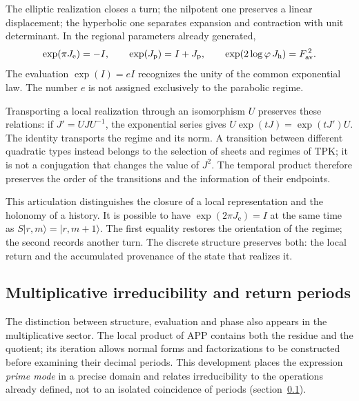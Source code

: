 The elliptic realization closes a turn; the nilpotent one preserves a
linear displacement; the hyperbolic one separates expansion and contraction with
unit determinant. In the regional parameters already generated,
\[
 \exp(\pi J_{\mathrm e})=-I,\qquad
 \exp(J_{\mathrm p})=I+J_{\mathrm p},\qquad
 \exp(2\log\varphi\,J_{\mathrm h})=F_{\rm av}^{\,2}.
\]
The evaluation \(\exp(I)=eI\) recognizes the unity of the common exponential
law. The number \(e\) is not assigned exclusively to the parabolic regime.

Transporting a local realization through an isomorphism \(U\) preserves
these relations: if \(J'=UJU^{-1}\), the exponential series gives
\(U\exp(tJ)=\exp(tJ')U\). The identity transports the regime and its
norm. A transition between different quadratic types instead belongs
to the selection of sheets and regimes of TPK; it is not a conjugation
that changes the value of \(J^2\). The temporal product therefore preserves the
order of the transitions and the information of their endpoints.

This articulation distinguishes the closure of a local representation and the
holonomy of a history. It is possible to have \(\exp(2\pi J_{\mathrm e})=I\)
at the same time as \(S|r,m\rangle=|r,m+1\rangle\). The first equality
restores the orientation of the regime; the second records another turn. The
discrete structure preserves both: the local return and the accumulated
provenance of the state that realizes it.




\subsection{Multiplicative irreducibility and return periods}
\label{x_reciprocidad:primos-retornos}

The distinction between structure, evaluation and phase also appears in the
multiplicative sector. The local product of APP contains both the residue
and the quotient; its iteration allows normal forms and
factorizations to be constructed before examining their decimal periods. This development
places the expression \emph{prime mode} in a precise domain and relates
irreducibility to the operations already defined, not to an isolated
coincidence of periods (section~\ref{x_reciprocidad:primos-retornos}).

